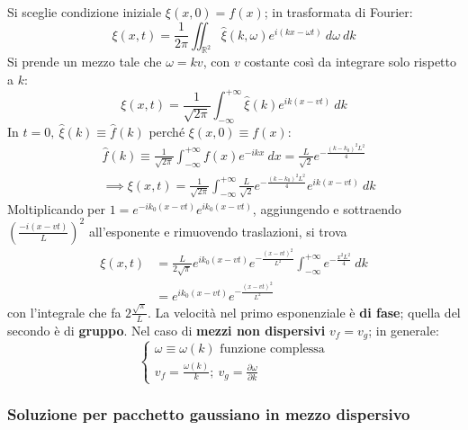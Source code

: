 \documentclass[10pt, a4paper]{scrartcl}
\numberwithin{equation}{subsection}
\theoremstyle{style1}
\begin{document}
Si sceglie condizione iniziale $\xi (x,0) = f(x)$; in trasformata di Fourier:
\[
\xi (x,t) = \frac{1}{2\pi} \iint_{\mathbb{R}^2} \hat{\xi }(k,\omega) e^{i(kx-\omega t)}\ d\omega\ dk
\] 
Si prende un mezzo tale che $\omega = k v$, con $v $ costante cos\`i da integrare solo rispetto a $k$:
\[
\xi (x,t) = \frac{1}{\sqrt{2\pi} } \int_{-\infty} ^{+\infty} \hat{\xi }(k) e^{ik(x-vt)} \ dk
\] 
In $t=0, \ \hat{\xi }(k) \equiv \hat{f}(k)$ perch\'e $\xi (x,0)\equiv f(x)$:
\[
	\begin{split}
		&\hat{f}(k)\equiv \frac{1}{\sqrt{2\pi} }\int_{-\infty }^{+\infty} f(x) e^{-ikx} \ dx = \frac{L}{\sqrt{2} }e^{-\frac{(k-k_0)^2 L^2}{4}} \\
		&\implies \xi (x,t) = \frac{1}{\sqrt{2\pi} }\int_{-\infty} ^{+\infty} \frac{L}{\sqrt{2} } e^{- \frac{(k-k_0)^2 L^2}{4}} e^{ik(x-vt)} \ dk
	\end{split}
\] 
Moltiplicando per $1=e^{-ik_0(x-vt)} e^{ik_0(x-vt)} $, aggiungendo e sottraendo $\left(\frac{-i(x-vt)}{L}\right) ^2$ all'esponente e rimuovendo traslazioni, si trova
\begin{equation}
	\begin{split}
		\xi (x,t) &= \frac{L}{2\sqrt{\pi} }e^{ik_0(x-vt) } e^{-\frac{(x-vt)^2}{L^2}} \int_{-\infty} ^{+\infty} e^{- \frac{x^2L^2}{4}} \ dk\\
			  &=e^{ik_0(x-vt)} e^{- \frac{(x-vt)^2}{L^2}} 
	\end{split}
\end{equation}
con l'integrale che fa $2 \frac{\sqrt{\pi} }{L}$. La velocit\`a nel primo esponenziale \`e \textbf{di fase}; quella del secondo \`e di \textbf{gruppo}. Nel caso di \textbf{mezzi non dispersivi} $v_f = v_g$; in generale:
\begin{equation}
	\begin{cases}
		\omega\equiv \omega (k) \text{ funzione complessa}\\
		v_f = \frac{\omega(k)}{k}; \ v_g = \frac{\partial \omega}{\partial k} 
	\end{cases}
\end{equation}
\subsubsection{Soluzione per pacchetto gaussiano in mezzo dispersivo}
\end{document}
